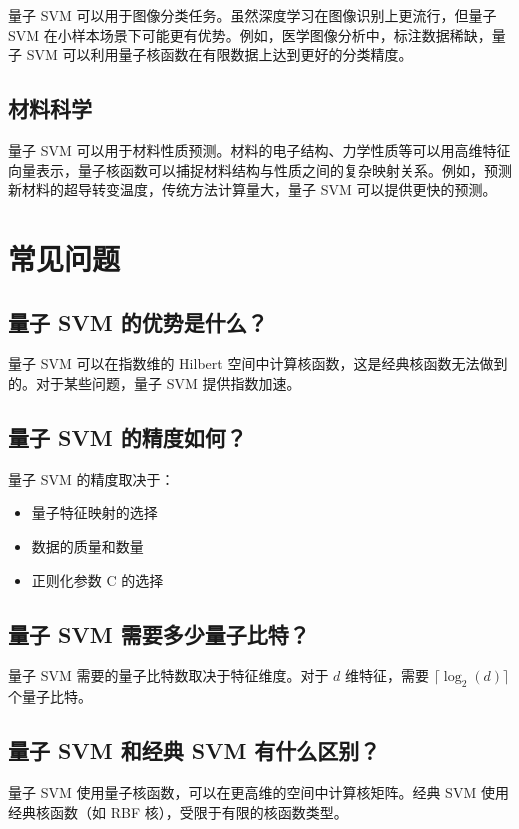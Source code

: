 \documentclass[12pt,a4paper]{article}
\begin{document}
量子 SVM 可以用于图像分类任务。虽然深度学习在图像识别上更流行，但量子 SVM 在小样本场景下可能更有优势。例如，医学图像分析中，标注数据稀缺，量子 SVM 可以利用量子核函数在有限数据上达到更好的分类精度。

\subsection{材料科学}

量子 SVM 可以用于材料性质预测。材料的电子结构、力学性质等可以用高维特征向量表示，量子核函数可以捕捉材料结构与性质之间的复杂映射关系。例如，预测新材料的超导转变温度，传统方法计算量大，量子 SVM 可以提供更快的预测。

\section{常见问题}

\subsection{量子 SVM 的优势是什么？}

量子 SVM 可以在指数维的 Hilbert 空间中计算核函数，这是经典核函数无法做到的。对于某些问题，量子 SVM 提供指数加速。

\subsection{量子 SVM 的精度如何？}

量子 SVM 的精度取决于：
\begin{itemize}
  \item 量子特征映射的选择
  \item 数据的质量和数量
  \item 正则化参数 C 的选择
\end{itemize}

\subsection{量子 SVM 需要多少量子比特？}

量子 SVM 需要的量子比特数取决于特征维度。对于 $d$ 维特征，需要 $\lceil \log_2(d) \rceil$ 个量子比特。

\subsection{量子 SVM 和经典 SVM 有什么区别？}

量子 SVM 使用量子核函数，可以在更高维的空间中计算核矩阵。经典 SVM 使用经典核函数（如 RBF 核），受限于有限的核函数类型。
\end{document}
